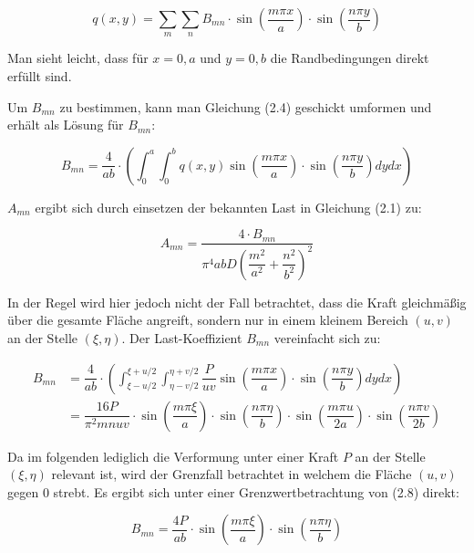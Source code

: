 \begin{equation} 
q(x,y) = \sum_m \sum_n B_{mn} \cdot \sin\left(\dfrac{m \pi x}{a}\right) \cdot \sin\left(\dfrac{n \pi y}{b}\right)
\end{equation} 

Man sieht leicht, dass für $x=0,a$ und $y=0,b$ die Randbedingungen direkt erfüllt sind.

Um $B_{mn}$ zu bestimmen, kann man Gleichung (2.4) geschickt umformen und erhält als Lösung für $B_{mn}$:


\begin{equation}
B_{mn} = \dfrac{4}{ab} \cdot \left( \int_0^a \int_0^b q(x,y) 
\sin\left(\dfrac{m \pi x}{a}\right) \cdot \sin\left( \dfrac{n \pi y}{b}\right) dy dx\right)
\end{equation}

$A_{mn}$ ergibt sich durch einsetzen der bekannten Last in Gleichung (2.1) zu:

\begin{equation}
A_{mn} = \dfrac{4 \cdot B_{mn}}{\pi^4 a b D \left(\dfrac{m^2}{a^2} + \dfrac{n^2}{b^2} \right)^2}
\end{equation}

In der Regel wird hier jedoch nicht der Fall betrachtet, dass die Kraft gleichmäßig über die gesamte Fläche angreift, sondern nur in einem kleinem Bereich $(u,v)$ an der Stelle $(\xi, \eta)$. Der Last-Koeffizient $B_{mn}$ vereinfacht sich zu:

\begin{align}
B_{mn} &= \dfrac{4}{ab} \cdot \left( \int_{\xi-u/2}^{\xi+u/2} \int_{\eta - v/2}^{\eta + v/2} \dfrac{P}{u v}
\sin\left(\dfrac{m \pi x}{a}\right) \cdot \sin\left( \dfrac{n \pi y}{b} \right)dy dx\right) \\
&= \dfrac{16P}{\pi^2 m n u v} 
\cdot \sin\left(\dfrac{m \pi \xi}{a}\right) 
\cdot \sin\left(\dfrac{n \pi \eta}{b}\right) 
\cdot \sin\left(\dfrac{m \pi u}{2a}\right) 
\cdot \sin\left(\dfrac{n \pi v}{2b}\right)
\end{align}

Da im folgenden lediglich die Verformung unter einer Kraft $P$ an der Stelle $(\xi, \eta)$ relevant ist, wird der Grenzfall betrachtet in welchem die Fläche $(u,v)$ gegen 0 strebt. Es ergibt sich unter einer Grenzwertbetrachtung von (2.8) direkt:

\begin{equation}
B_{mn} = \dfrac{4P}{a b} 
\cdot \sin\left(\dfrac{m \pi \xi}{a}\right) 
\cdot \sin\left(\dfrac{n \pi \eta}{b}\right) 
\end{equation}

